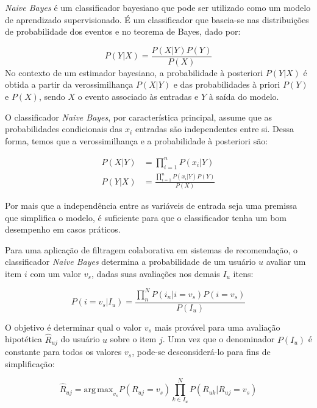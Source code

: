 \textit{Naive Bayes} é um classificador bayesiano que pode ser utilizado como um
modelo de aprendizado supervisionado. É um classificador que baseia-se nas distribuições de
probabilidade dos eventos e no teorema de Bayes, dado por:

\begin{equation}
    P(Y|X) = \frac{P(X|Y)P(Y)}{P(X)}
    \end{equation}
No contexto de um estimador bayesiano, a probabilidade à posteriori $P(Y|X)$ é
obtida a partir da verossimilhança $P(X|Y)$ e das probabilidades à priori $P(Y)$
e $P(X)$, sendo $X$ o evento associado às entradas e $Y$ à saída do modelo.

O classificador \textit{Naive Bayes}, por característica principal, assume que
as probabilidades condicionais das $x_i$ entradas são independentes entre si.
Dessa forma, temos que a verossimilhança e a probabilidade à posteriori são:

\begin{align}
    P(X|Y) &= \prod_{i=1}^{n}P(x_i|Y) \\
    P(Y|X) &= \frac{\prod_{i=1}^{n}P(x_i|Y)P(Y)}{P(X)}
\end{align}

Por mais que a independência entre as variáveis de entrada seja uma premissa
que simplifica o modelo, é suficiente para que o classificador tenha um bom
desempenho em casos práticos.

Para uma aplicação de filtragem colaborativa em sistemas de recomendação, o
classificador \textit{Naive Bayes} determina a probabilidade de um usuário $u$
avaliar um item $i$ com um valor $v_s$, dadas suas avaliações nos demais $I_u$
itens:

\begin{equation}
    P(i = v_s|I_u) = \frac{\prod_{n}^{N}P(i_{n}|i = v_s)P(i = v_s)}{P(I_u)}
\end{equation}

O objetivo é determinar qual o valor $v_s$ mais provável para uma avaliação
hipotética $\hat{R}_{uj}$ do usuário $u$ sobre o item $j$. Uma vez que o denominador $P(I_u)$
é constante para todos os valores $v_s$, pode-se desconsiderá-lo para fins de
simplificação:

\begin{equation}
    \hat{R}_{uj} = \mathrm{arg\,max}_{v_s} P(R_{uj} = v_s) \prod_{k \in I_{u}}^{N}P(R_{uk}|R_{uj} = v_s)
\end{equation}
    
